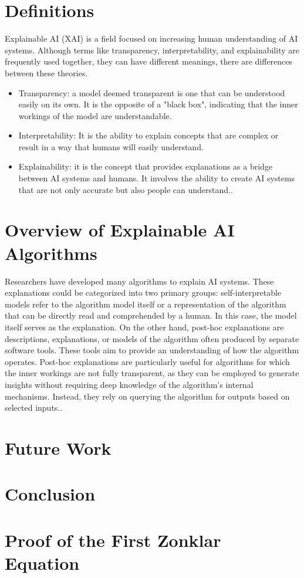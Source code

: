 \documentclass[10pt,journal,compsoc]{IEEEtran}
\begin{document}
\section{Definitions}

Explainable AI (XAI) is a field focused on increasing human understanding of AI systems. Although terms like transparency, interpretability, and explainability are frequently used together, they can have different meanings, there are differences between these theories.\cite{xai-ml}

\begin{itemize}
    \item {Transparency}: a model deemed transparent is one that can be understood easily on its own. It is the opposite of a "black box", indicating that the inner workings of the model are understandable\cite{transparency}.
    \item {Interpretability}: It is the ability to explain concepts that are complex or result in a way that humans will easily understand\cite{gilpin2019explaining}.
    \item {Explainability}: it is the concept that provides explanations as a bridge between AI systems and humans. It involves the ability to create AI systems that are not only accurate but also people can understand.\cite{gilpin2019explaining}.
\end{itemize}

\section{Overview of Explainable AI Algorithms}
Researchers have developed many algorithms to explain AI systems. These explanations could be categorized into two primary groups: self-interpretable models refer to the algorithm model itself or a representation of the algorithm that can be directly read and comprehended by a human. In this case, the model itself serves as the explanation. On the other hand, post-hoc explanations are descriptions, explanations, or models of the algorithm often produced by separate software tools. These tools aim to provide an understanding of how the algorithm operates. Post-hoc explanations are particularly useful for algorithms for which the inner workings are not fully transparent, as they can be employed to generate insights without requiring deep knowledge of the algorithm's internal mechanisms. Instead, they rely on querying the algorithm for outputs based on selected inputs.\cite{phillips2020four}.

\section{Future Work}


\section{Conclusion}


\appendices
\section{Proof of the First Zonklar Equation}


\section{}


\printbibliography
\end{document}
